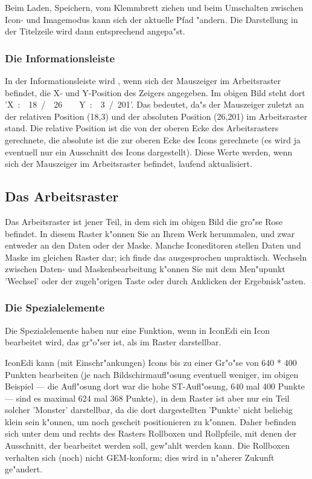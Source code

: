 Beim Laden, Speichern, vom Klemmbrett ziehen und beim Umschalten 
zwischen Icon- und Imagemodus kann sich der aktuelle Pfad "andern. 
Die Darstellung in der Titelzeile wird dann entsprechend angepa"st. 

\subsubsection{Die Informationsleiste} 
In der Informationsleiste wird , wenn sich der Mauszeiger im 
Arbeitsraster befindet, die X- und Y-Position des Zeigers 
angegeben. Im obigen Bild steht dort 
'X~:~~18~/~~26~~~~Y~:~~3~/~201'. Das bedeutet, da"s der Mauszeiger 
zuletzt an der relativen Position (18,3) und der absoluten 
Position (26,201) im Arbeitsraster stand. 
Die relative Position ist die von der oberen Ecke des 
Arbeitsrasters gerechnete, die absolute ist die zur oberen Ecke 
des Icons gerechnete (es wird ja eventuell nur ein Ausschnitt 
des Icons dargestellt). Diese Werte werden, wenn sich der 
Mauszeiger im Arbeitsraster befindet, laufend aktualisiert.

\subsection{Das Arbeitsraster} 
Das Arbeitsraster ist jener Teil, in dem sich im obigen Bild die
gro"se Rose befindet. In diesem Raster k"onnen Sie an Ihrem Werk
herummalen, und zwar entweder an den Daten oder der Maske. Manche
Iconeditoren stellen Daten und Maske im gleichen Raster dar; ich
finde das ausgesprochen unpraktisch. Wechseln zwischen Daten-
und Maskenbearbeitung k"onnen Sie mit dem Men"upunkt 'Wechsel' oder
der zugeh"origen Taste oder durch Anklicken der Ergebnisk"asten.

\subsubsection{Die Spezialelemente} 
Die Spezialelemente  haben nur eine Funktion, wenn in IconEdi ein 
Icon bearbeitet wird, das gr"o"ser ist, als im Raster darstellbar.

IconEdi kann (mit Einschr"ankungen) Icons bis zu einer Gr"o"se von 
640 * 400 Punkten bearbeiten (je nach Bildschirmaufl"osung eventuell 
weniger, im obigen Beispiel --- die Aufl"osung dort war die hohe 
ST-Aufl"osung, 640 mal 400 Punkte --- sind es maximal 624 mal 368 
Punkte), in dem Raster ist aber nur ein Teil solcher 'Monster' 
darstellbar, da die dort dargestellten 'Punkte' nicht beliebig klein 
sein k"onnen, um noch gescheit positionieren zu k"onnen. Daher 
befinden sich unter dem und rechts des Rasters Rollboxen und 
Rollpfeile, mit denen der Ausschnitt, der bearbeitet werden soll, 
gew"ahlt werden kann. Die Rollboxen verhalten sich (noch) nicht 
GEM-konform; dies wird in n"aherer Zukunft ge"andert. 

